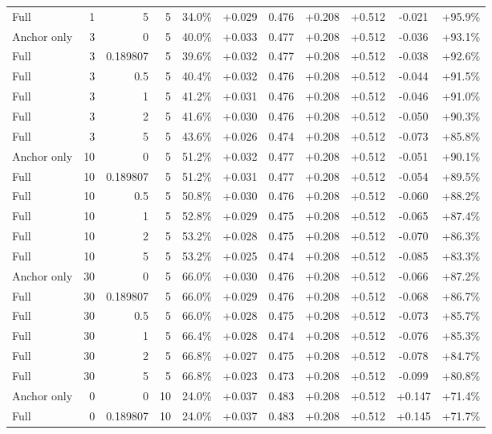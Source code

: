 \begin{table}[htbp]
\begin{tabular}{lrrrccccccc}
Full & 1 & 5 & 5 & 34.0\% & +0.029 & 0.476 & +0.208 & +0.512 & -0.021 & +95.9\% \\
Anchor only & 3 & 0 & 5 & 40.0\% & +0.033 & 0.477 & +0.208 & +0.512 & -0.036 & +93.1\% \\
Full & 3 & 0.189807 & 5 & 39.6\% & +0.032 & 0.477 & +0.208 & +0.512 & -0.038 & +92.6\% \\
Full & 3 & 0.5 & 5 & 40.4\% & +0.032 & 0.476 & +0.208 & +0.512 & -0.044 & +91.5\% \\
Full & 3 & 1 & 5 & 41.2\% & +0.031 & 0.476 & +0.208 & +0.512 & -0.046 & +91.0\% \\
Full & 3 & 2 & 5 & 41.6\% & +0.030 & 0.476 & +0.208 & +0.512 & -0.050 & +90.3\% \\
Full & 3 & 5 & 5 & 43.6\% & +0.026 & 0.474 & +0.208 & +0.512 & -0.073 & +85.8\% \\
Anchor only & 10 & 0 & 5 & 51.2\% & +0.032 & 0.477 & +0.208 & +0.512 & -0.051 & +90.1\% \\
Full & 10 & 0.189807 & 5 & 51.2\% & +0.031 & 0.477 & +0.208 & +0.512 & -0.054 & +89.5\% \\
Full & 10 & 0.5 & 5 & 50.8\% & +0.030 & 0.476 & +0.208 & +0.512 & -0.060 & +88.2\% \\
Full & 10 & 1 & 5 & 52.8\% & +0.029 & 0.475 & +0.208 & +0.512 & -0.065 & +87.4\% \\
Full & 10 & 2 & 5 & 53.2\% & +0.028 & 0.475 & +0.208 & +0.512 & -0.070 & +86.3\% \\
Full & 10 & 5 & 5 & 53.2\% & +0.025 & 0.474 & +0.208 & +0.512 & -0.085 & +83.3\% \\
Anchor only & 30 & 0 & 5 & 66.0\% & +0.030 & 0.476 & +0.208 & +0.512 & -0.066 & +87.2\% \\
Full & 30 & 0.189807 & 5 & 66.0\% & +0.029 & 0.476 & +0.208 & +0.512 & -0.068 & +86.7\% \\
Full & 30 & 0.5 & 5 & 66.0\% & +0.028 & 0.475 & +0.208 & +0.512 & -0.073 & +85.7\% \\
Full & 30 & 1 & 5 & 66.4\% & +0.028 & 0.474 & +0.208 & +0.512 & -0.076 & +85.3\% \\
Full & 30 & 2 & 5 & 66.8\% & +0.027 & 0.475 & +0.208 & +0.512 & -0.078 & +84.7\% \\
Full & 30 & 5 & 5 & 66.8\% & +0.023 & 0.473 & +0.208 & +0.512 & -0.099 & +80.8\% \\
Anchor only & 0 & 0 & 10 & 24.0\% & +0.037 & 0.483 & +0.208 & +0.512 & +0.147 & +71.4\% \\
Full & 0 & 0.189807 & 10 & 24.0\% & +0.037 & 0.483 & +0.208 & +0.512 & +0.145 & +71.7\% \\

\end{tabular}
\end{table}
